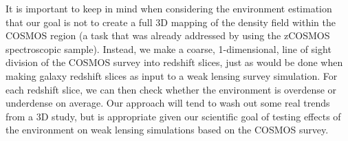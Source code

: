 \documentclass[twocolumn,useAMS,usenatbib]{mn2e}
\newcommand{\rachel}[1]{{\textcolor{red}{#1}}}
\begin{document}

It is important to keep in mind when considering the environment
estimation that our goal is not to create a full 3D mapping of the
density field within the COSMOS region (a task that was already
addressed by \citealt{Kovac_Density10k} using the zCOSMOS
spectroscopic sample).  Instead, we make a coarse, 1-dimensional, line of sight division of the
COSMOS survey into redshift slices, just as would be done when making
galaxy redshift slices as input to a weak lensing survey simulation.
For each redshift slice, we can then check whether the environment is
overdense or underdense on average.  Our approach will tend to wash
out some real trends from a 3D study, but is appropriate given our
scientific goal of testing effects of the environment on weak lensing
simulations based on the COSMOS survey.

\end{document}
